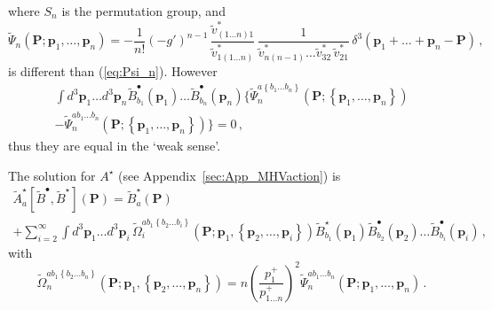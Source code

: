 \documentclass[english,american]{article}
\begin{document}
where $S_{n}$ is the permutation group, and
\begin{equation}
\tilde{\Psi}_{n}\left(\mathbf{P};\mathbf{p}_{1},\dots,\mathbf{p}_{n}\right)=-\frac{1}{n!}\left(-g'\right)^{n-1}\,\frac{\tilde{v}_{\left(1\dots n\right)1}^{*}}{\tilde{v}_{1\left(1\dots n\right)}^{*}}\,\frac{1}{\tilde{v}_{n\left(n-1\right)}^{*}\dots\tilde{v}_{32}^{*}\,\tilde{v}_{21}^{*}}\,\delta^{3}\left(\mathbf{p}_{1}+\dots+\mathbf{p}_{n}-\mathbf{P}\right)\,,\label{eq:Psi_colorord}
\end{equation}
is different than (\ref{eq:Psi_n}). However 
\begin{multline}
\int d^{3}\mathbf{p}_{1}\dots d^{3}\mathbf{p}_{n}\tilde{B}_{b_{1}}^{\bullet}\left(\mathbf{p}_{1}\right)\dots\tilde{B}_{b_{n}}^{\bullet}\left(\mathbf{p}_{n}\right)\Bigg\{\tilde{\Psi}_{n}^{a\left\{ b_{1}\dots b_{n}\right\} }\left(\mathbf{P};\left\{ \mathbf{p}_{1},\dots,\mathbf{p}_{n}\right\} \right)\\
-\tilde{\Psi}_{n}^{ab_{1}\dots b_{n}}\left(\mathbf{P};\left\{ \mathbf{p}_{1},\dots,\mathbf{p}_{n}\right\} \right)\Bigg\}=0\,,
\end{multline}
thus they are equal in the `weak sense'. 

The solution for $A^{\star}$ (see Appendix~\ref{sec:App_MHVaction}) is
\begin{multline}
\tilde{A}_{a}^{\star}\left[\tilde{B}^{\bullet},\tilde{B}^{\star}\right]\left(\mathbf{P}\right)=\tilde{B}_{a}^{\star}\left(\mathbf{P}\right)\\
+\sum_{i=2}^{\infty}\int d^{3}\mathbf{p}_{1}\dots d^{3}\mathbf{p}_{i}\,\tilde{\Omega}_{i}^{ab_{1}\left\{ b_{2}\dots b_{i}\right\} }\left(\mathbf{P};\mathbf{p}_{1},\left\{ \mathbf{p}_{2},\dots,\mathbf{p}_{i}\right\} \right)\tilde{B}_{b_{1}}^{\star}\left(\mathbf{p}_{1}\right)\tilde{B}_{b_{2}}^{\bullet}\left(\mathbf{p}_{2}\right)\dots\tilde{B}_{b_{i}}^{\bullet}\left(\mathbf{p}_{i}\right)\,,\label{eq:Am[B]}
\end{multline}
with
\begin{equation}
\tilde{\Omega}_{n}^{ab_{1}\left\{ b_{2}\dots b_{n}\right\} }\left(\mathbf{P};\mathbf{p}_{1},\left\{ \mathbf{p}_{2},\dots,\mathbf{p}_{n}\right\} \right)=n\left(\frac{p_{1}^{+}}{p_{1\dots n}^{+}}\right)^{2}\tilde{\Psi}_{n}^{ab_{1}\dots b_{n}}\left(\mathbf{P};\mathbf{p}_{1},\dots,\mathbf{p}_{n}\right)\,.\label{eq:Omega_n}
\end{equation}
\end{document}
